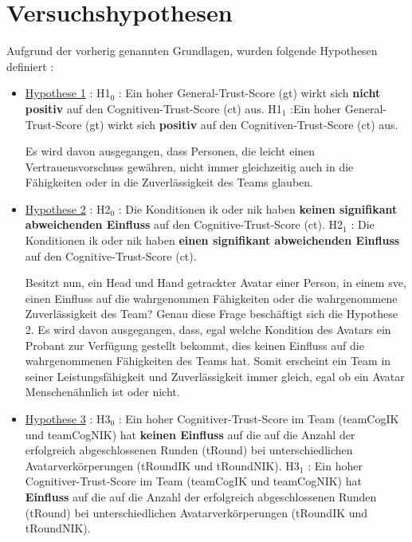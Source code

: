 \documentclass[a4paper,11pt]{article}%
\renewcommand{\\}{\vspace*{0.5\baselineskip} \newline}
\begin{document}
\section{Versuchshypothesen}
\label{Versuchshypothesen}
Aufgrund der vorherig genannten Grundlagen, wurden folgende Hypothesen definiert :
\begin{itemize}
	\item{\underline{Hypothese 1} :\\ 
	H1$_{0}$ : Ein hoher General-Trust-Score (\ac{gt}) wirkt sich \textbf{nicht positiv} auf den Cognitiven-Trust-Score (\ac{ct}) aus. \\
	H1$_{1}$ :Ein hoher General-Trust-Score (\ac{gt}) wirkt sich \textbf{positiv} auf den Cognitiven-Trust-Score (\ac{ct}) aus.}
	
Es wird davon ausgegangen, dass Personen, die leicht einen Vertrauensvorschuss gewähren, nicht immer gleichzeitig auch in die Fähigkeiten oder in die Zuverlässigkeit des Teams glauben.

\item{\underline{Hypothese 2} :\\ 
	H2$_{0}$ : Die Konditionen \ac{ik} oder \ac{nik} haben \textbf{keinen signifikant abweichenden Einfluss} auf den Cognitive-Trust-Score (\ac{ct}). \\
	H2$_{1}$ : Die Konditionen \ac{ik} oder \ac{nik} haben \textbf{einen signifikant abweichenden Einfluss} auf den Cognitive-Trust-Score (\ac{ct}).}

	
Besitzt nun, ein Head und Hand getrackter Avatar einer Person, in einem \ac{sve}, einen Einfluss auf die wahrgenommen Fähigkeiten oder die wahrgenommene Zuverlässigkeit des Team? Genau diese Frage beschäftigt sich die Hypothese 2.
Es wird davon ausgegangen, dass, egal welche Kondition des Avatars ein Probant zur Verfügung gestellt bekommt, dies keinen Einfluss auf die wahrgenommenen Fähigkeiten des Teams hat. Somit erscheint ein Team in seiner Leistungsfähigkeit und Zuverlässigkeit immer gleich, egal ob ein Avatar Menschenähnlich ist oder nicht.

	\item{\underline{Hypothese 3} :\\ 
	H3$_{0}$ : Ein hoher Cognitiver-Trust-Score im Team (\ac{teamCogIK} und \ac{teamCogNIK}) hat \textbf{keinen Einfluss} auf die auf die Anzahl der erfolgreich abgeschlossenen Runden (\ac{tRound}) bei unterschiedlichen Avatarverkörperungen (\ac{tRoundIK} und \ac{tRoundNIK}). \\
	H3$_{1}$ : Ein hoher Cognitiver-Trust-Score im Team (\ac{teamCogIK} und \ac{teamCogNIK}) hat \textbf{Einfluss} auf die auf die Anzahl der erfolgreich abgeschlossenen Runden (\ac{tRound}) bei unterschiedlichen Avatarverkörperungen (\ac{tRoundIK} und \ac{tRoundNIK}).}
	

\end{itemize}
\end{document}
